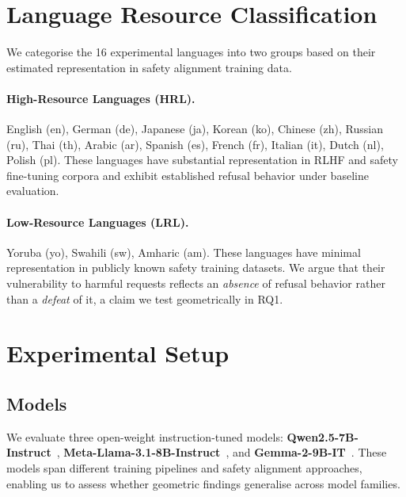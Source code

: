 \section{Language Resource Classification}
\label{sec:lang_classification}

We categorise the 16 experimental languages into two groups based on their estimated representation in safety alignment training data.

\paragraph{High-Resource Languages (HRL).}
English (en), German (de), Japanese (ja), Korean (ko), Chinese (zh), Russian (ru), Thai (th), Arabic (ar), Spanish (es), French (fr), Italian (it), Dutch (nl), Polish (pl). These languages have substantial representation in RLHF and safety fine-tuning corpora and exhibit established refusal behavior under baseline evaluation.

\paragraph{Low-Resource Languages (LRL).}
Yoruba (yo), Swahili (sw), Amharic (am). These languages have minimal representation in publicly known safety training datasets. We argue that their vulnerability to harmful requests reflects an \textit{absence} of refusal behavior rather than a \textit{defeat} of it, a claim we test geometrically in RQ1.

\section{Experimental Setup}
\label{sec:setup}

\subsection{Models}

We evaluate three open-weight instruction-tuned models: \textbf{Qwen2.5-7B-Instruct}~\citep{qwen25}, \textbf{Meta-Llama-3.1-8B-Instruct}~\citep{llama31}, and \textbf{Gemma-2-9B-IT}~\citep{gemma2}. These models span different training pipelines and safety alignment approaches, enabling us to assess whether geometric findings generalise across model families.


